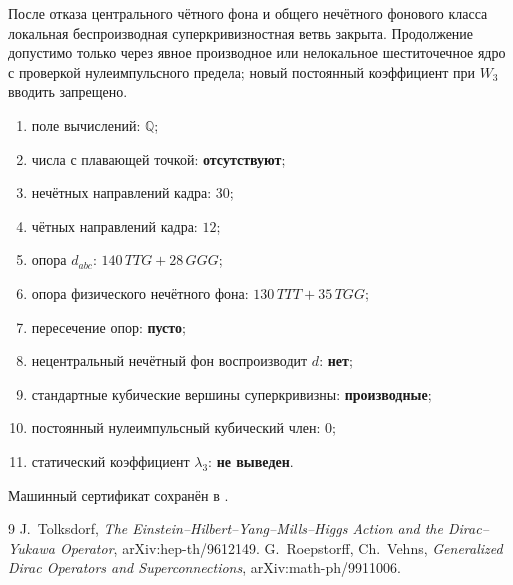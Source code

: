 \begin{nogocriterion}
После отказа центрального чётного фона и общего нечётного фонового класса
локальная беспроизводная суперкривизностная ветвь закрыта. Продолжение
допустимо только через явное производное или нелокальное шеститочечное ядро
с проверкой нулеимпульсного предела; новый постоянный коэффициент при $W_3$
вводить запрещено.
\end{nogocriterion}

\begin{protocol}
\begin{enumerate}
 \item поле вычислений: \textbf{$\mathbb Q$};
 \item числа с плавающей точкой: \textbf{отсутствуют};
 \item нечётных направлений кадра: \textbf{$30$};
 \item чётных направлений кадра: \textbf{$12$};
 \item опора $d_{abc}$: \textbf{$140\,TTG+28\,GGG$};
 \item опора физического нечётного фона:
       \textbf{$130\,TTT+35\,TGG$};
 \item пересечение опор: \textbf{пусто};
 \item нецентральный нечётный фон воспроизводит $d$: \textbf{нет};
 \item стандартные кубические вершины суперкривизны:
       \textbf{производные};
 \item постоянный нулеимпульсный кубический член: \textbf{$0$};
 \item статический коэффициент $\lambda_3$: \textbf{не выведен}.
\end{enumerate}
\end{protocol}

Машинный сертификат сохранён в
.

\begin{thebibliography}{9}
J.~Tolksdorf,
\emph{The Einstein--Hilbert--Yang--Mills--Higgs Action and the Dirac--Yukawa Operator},
arXiv:hep-th/9612149.
G.~Roepstorff, Ch.~Vehns,
\emph{Generalized Dirac Operators and Superconnections},
arXiv:math-ph/9911006.
\end{thebibliography}